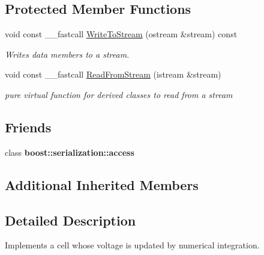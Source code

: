 \subsection*{Protected Member Functions}
\begin{DoxyCompactItemize}
\item 
\hypertarget{class_t_model_cell_ada53cf8aa063c8b8f8db1eff8c9ddb67}{void const \+\_\+\+\_\+fastcall \hyperlink{class_t_model_cell_ada53cf8aa063c8b8f8db1eff8c9ddb67}{Write\+To\+Stream} (ostream \&stream) const }\label{class_t_model_cell_ada53cf8aa063c8b8f8db1eff8c9ddb67}

\begin{DoxyCompactList}\small\item\em Writes data members to a stream. \end{DoxyCompactList}\item 
\hypertarget{class_t_model_cell_a94252d562aa94352f259d2efa371c0b8}{void const \+\_\+\+\_\+fastcall \hyperlink{class_t_model_cell_a94252d562aa94352f259d2efa371c0b8}{Read\+From\+Stream} (istream \&stream)}\label{class_t_model_cell_a94252d562aa94352f259d2efa371c0b8}

\begin{DoxyCompactList}\small\item\em pure virtual function for derived classes to read from a stream \end{DoxyCompactList}\end{DoxyCompactItemize}
\subsection*{Friends}
\begin{DoxyCompactItemize}
\item 
\hypertarget{class_t_model_cell_ac98d07dd8f7b70e16ccb9a01abf56b9c}{class {\bfseries boost\+::serialization\+::access}}\label{class_t_model_cell_ac98d07dd8f7b70e16ccb9a01abf56b9c}

\end{DoxyCompactItemize}
\subsection*{Additional Inherited Members}


\subsection{Detailed Description}
Implements a cell whose voltage is updated by numerical integration. 

